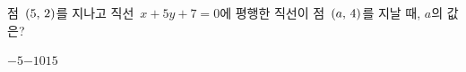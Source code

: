 점~$(5,\mkern3mu 2)$를 지나고 직선~$x+5y+7=0$에 평행한 직선이 점~$(a,\mkern3mu 4)$를 지날 때, $a$의 값은?
\begin{choices32}{$-5$}{$-1$}{$0$}{$1$}{$5$}\end{choices32}
